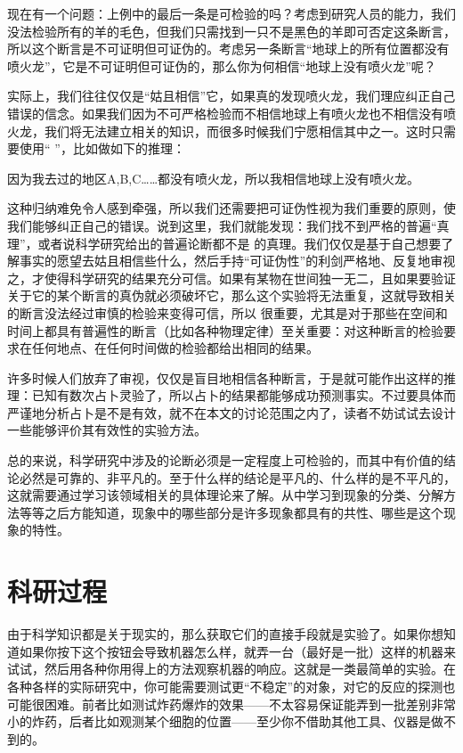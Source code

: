 \documentclass[a4paper,10pt,english]{sphinxmanual}
\begin{document}
现在有一个问题：上例中的最后一条是可检验的吗？考虑到研究人员的能力，我们没法检验所有的羊的毛色，但我们只需找到一只不是黑色的羊即可否定这条断言，所以这个断言是不可证明但可证伪的。考虑另一条断言“地球上的所有位置都没有喷火龙”，它是不可证明但可证伪的，那么你为何相信“地球上没有喷火龙”呢？

实际上，我们往往仅仅是“姑且相信”它，如果真的发现喷火龙，我们理应纠正自己错误的信念。如果我们因为不可严格检验而不相信地球上有喷火龙也不相信没有喷火龙，我们将无法建立相关的知识，而很多时候我们宁愿相信其中之一。这时只需要使用“  ”，比如做如下的推理：

因为我去过的地区A,B,C……都没有喷火龙，所以我相信地球上没有喷火龙。

这种归纳难免令人感到牵强，所以我们还需要把可证伪性视为我们重要的原则，使我们能够纠正自己的错误。说到这里，我们就能发现：我们找不到严格的普遍“真理”，或者说科学研究给出的普遍论断都不是  的真理。我们仅仅是基于自己想要了解事实的愿望去姑且相信些什么，然后手持“可证伪性”的利剑严格地、反复地审视之，才使得科学研究的结果充分可信。如果有某物在世间独一无二，且如果要验证关于它的某个断言的真伪就必须破坏它，那么这个实验将无法重复，这就导致相关的断言没法经过审慎的检验来变得可信，所以  很重要，尤其是对于那些在空间和时间上都具有普遍性的断言（比如各种物理定律）至关重要：对这种断言的检验要求在任何地点、在任何时间做的检验都给出相同的结果。

许多时候人们放弃了审视，仅仅是盲目地相信各种断言，于是就可能作出这样的推理：已知有数次占卜灵验了，所以占卜的结果都能够成功预测事实。不过要具体而严谨地分析占卜是不是有效，就不在本文的讨论范围之内了，读者不妨试试去设计一些能够评价其有效性的实验方法。

总的来说，科学研究中涉及的论断必须是一定程度上可检验的，而其中有价值的结论必然是可靠的、非平凡的。至于什么样的结论是平凡的、什么样的是不平凡的，这就需要通过学习该领域相关的具体理论来了解。从中学习到现象的分类、分解方法等等之后方能知道，现象中的哪些部分是许多现象都具有的共性、哪些是这个现象的特性。


\section{科研过程}
\label{\detokenize{3. Intro_Research:id3}}
由于科学知识都是关于现实的，那么获取它们的直接手段就是实验了。如果你想知道如果你按下这个按钮会导致机器怎么样，就弄一台（最好是一批）这样的机器来试试，然后用各种你用得上的方法观察机器的响应。这就是一类最简单的实验。在各种各样的实际研究中，你可能需要测试更“不稳定”的对象，对它的反应的探测也可能很困难。前者比如测试炸药爆炸的效果——不太容易保证能弄到一批差别非常小的炸药，后者比如观测某个细胞的位置——至少你不借助其他工具、仪器是做不到的。
\end{document}
